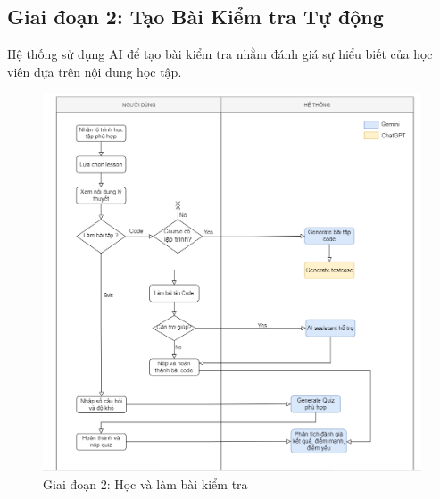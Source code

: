 \subsection{Giai đoạn 2: Tạo Bài Kiểm tra Tự động}
Hệ thống sử dụng AI để tạo bài kiểm tra nhằm đánh giá sự hiểu biết của học viên dựa trên nội dung học tập.
\begin{figure}[H]
    \centering
    \includegraphics[width=\linewidth]{Images/flowchart_2.png}
    \caption{Giai đoạn 2: Học và làm bài kiểm tra}
\end{figure}
